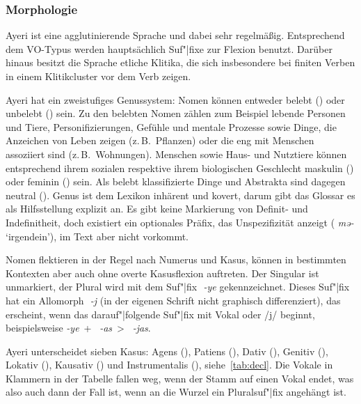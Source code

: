 \documentclass[
	12pt,
	ngerman,
]{scrartcl}
\newcommand{\zwsp}{\mbox{​}} %
\newcommand{\rayr}[2]{\zwsp\smash{{\Tagati #1}} \emph{#2}} %
\newcommand{\xayr}[3]{\zwsp\smash{\Tagati #1} \emph{#2} `#3'} %
\begin{document}
\subsubsection{Morphologie}

Ayeri ist eine agglutinierende Sprache und dabei sehr regelmäßig. Entsprechend
dem VO-Typus werden hauptsächlich Suf"|fixe zur Flexion benutzt.
Darüber hinaus besitzt die Sprache etliche Klitika, die sich insbesondere bei
finiten Verben in einem Klitikcluster vor dem Verb zeigen.

\label{subsubsec:nom}

Ayeri hat ein zweistufiges Genussystem: Nomen können entweder belebt (\Anim)
oder unbelebt (\Inan) sein. Zu den belebten Nomen zählen zum Beispiel lebende
Personen und Tiere, Personifizierungen, Gefühle und mentale Prozesse sowie
Dinge, die Anzeichen von Leben zeigen (z.\,B.~Pflanzen) oder die eng mit
Menschen assoziiert sind (z.\,B.~Wohnungen). Menschen sowie Haus- und Nutztiere
können entsprechend ihrem sozialen respektive ihrem biologischen Geschlecht
maskulin (\M) oder feminin (\F) sein. Als belebt klassifizierte Dinge und
Abstrakta sind dagegen neutral (\N). Genus ist dem Lexikon inhärent und kovert,
darum gibt das Glossar es als Hilfsstellung explizit an. Es gibt keine
Markierung von Definit- und Indefinitheit, doch existiert ein optionales Präfix,
das Unspezifizität anzeigt (\xayr{me/}{mə-}{irgendein}), im Text aber nicht
vorkommt.

Nomen flektieren in der Regel nach Numerus und Kasus, können in bestimmten
Kontexten aber auch ohne overte Kasusflexion auftreten. Der Singular ist
unmarkiert, der Plural wird mit dem Suf"|fix \rayr{/ye}{-ye} gekennzeichnet.
Dieses Suf"|fix hat ein Allomorph \rayr{/ye}{-j} (in der eigenen Schrift nicht
graphisch differenziert), das erscheint, wenn das darauf"|folgende Suf"|fix mit
Vokal oder /j/ beginnt, beispielsweise
\rayr{/ye}{-ye}~+~\rayr{/AsF}{-as}~>~\rayr{/ye\_asF}{-jas}.

Ayeri unterscheidet sieben Kasus: Agens (\Aarg), Patiens (\Parg), Dativ (\Dat),
Genitiv (\Gen), Lokativ (\Loc), Kausativ (\Caus) und Instrumentalis (\Ins),
siehe~\cref{tab:decl}. Die Vokale in Klammern in der Tabelle fallen weg, wenn
der Stamm auf einen Vokal endet, was also auch dann der Fall ist, wenn an die
Wurzel ein Pluralsuf"|fix angehängt ist.
\end{document}
